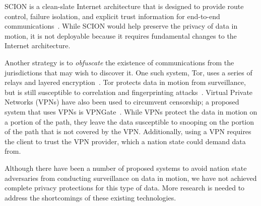SCION is a clean-slate Internet architecture that is designed to provide route
control, failure isolation, and explicit trust information for end-to-end
communications~\cite{zhang2011scion}.  While SCION would help preserve the
privacy of data in motion, it is not deployable because it requires
fundamental changes to the Internet architecture.


Another strategy is to {\em obfuscate} the existence of communications from
the jurisdictions that may wish to discover it. One such system, Tor, uses a
series of relays and layered encryption~\cite{dingledine2004tor}.  Tor
protects data in motion from surveillance, but is still susceptible to
correlation and fingerprinting
attacks~\cite{sun2015raptor,shmatikov2006timing,feamster2004location,greschbach2016effect}.  Virtual Private Networks (VPNs) have also been
used to circumvent censorship; a proposed system that uses VPNs is
VPNGate~\cite{nobori2014vpn}.  While VPNs protect the data in motion on a
portion of the path, they leave the data susceptible to snooping on the
portion of the path that is not covered by the VPN.  Additionally, using a VPN
requires the client to trust the VPN provider, which a nation state could
demand data from.

Although there have been a number of proposed systems to avoid nation state
adversaries from conducting surveillance on data in motion, we
have not achieved complete privacy protections for this type of data. More research
is needed to address the shortcomings of these existing technologies.
